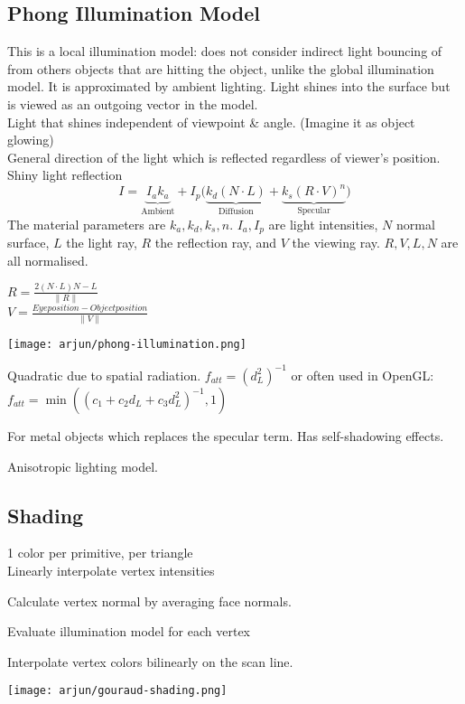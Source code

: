 \subsection*{Phong Illumination Model}
This is a local illumination model: does not consider indirect light bouncing of from others objects that are hitting the object, unlike the global illumination model. It is approximated by ambient lighting.
Light shines into the surface but is viewed as an outgoing vector in the model.\\
 Light that shines independent of viewpoint \& angle. (Imagine it as object glowing) \\
 General direction of the light which is reflected regardless of viewer's position.\\
 Shiny light reflection
$$I = \underbrace{I_ak_a }_\text{Ambient} + I_p \bigl( \underbrace{k_d(N \cdot L)}_\text{Diffusion} + \underbrace{k_s(R \cdot V)^n}_\text{Specular} \bigr)$$
The material parameters are $k_a, k_d, k_s, n$. $I_a, I_p$ are light intensities, $N$ normal surface, $L$ the light ray, $R$ the reflection ray, and $V$ the viewing ray. $R, V, L, N$ are all normalised. 

\begin{minipage}{0.6\columnwidth}
    $R = \frac{2(N \cdot L)N - L}{\lVert R \rVert} $ \\
$V = \frac{Eye position - Object position}{\lVert V \rVert} $
\end{minipage}
\begin{minipage}{0.4\columnwidth}
    \texttt{[image: arjun/phong-illumination.png]}
\end{minipage}
    Quadratic due to spatial radiation. \(f_{att} = (d_L^2)^{-1}\) or often used in OpenGL:
    \(f_{att} = \min((c_1 + c_2d_L + c_3d_L^2)^{-1}, 1)\)
  
  
    For metal objects which replaces the specular term. Has self-shadowing effects.
  
  
    Anisotropic lighting model.
  
\subsection*{Shading}
 1 color per primitive, per triangle \\
 Linearly interpolate vertex intensities
\begin{compactenum}
    \item Calculate vertex normal by averaging face normals.
    \item Evaluate illumination model for each vertex
    \item Interpolate vertex colors bilinearly on the scan line.
\end{compactenum}
\begin{center}
    \texttt{[image: arjun/gouraud-shading.png]}
\end{center}

